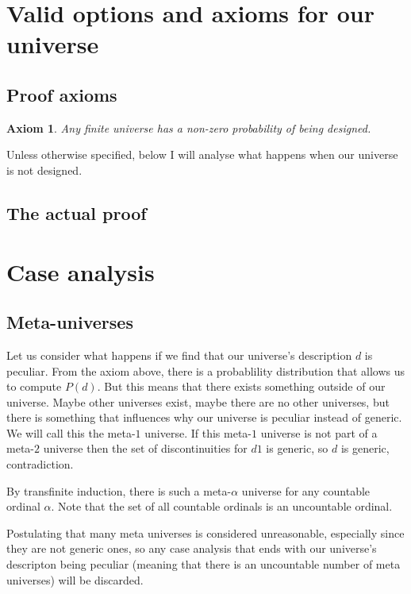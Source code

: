 \documentclass[a4paper
,draft
]{article}
\newtheorem{axiom}{Axiom}
\begin{document}
\section{Valid options and axioms for our universe}


\subsection{Proof axioms}

\begin{axiom}
Any finite universe has a non-zero probability of being designed.
\end{axiom}

Unless otherwise specified, below I will analyse what happens when our
universe is not designed.

\subsection {The actual proof}

\section{Case analysis}

\subsection{Meta-universes}

Let us consider what happens if we find that our universe's description $d$ is peculiar. From the axiom above, there is a probablility distribution that allows us to compute $P(d)$. But this means that there exists something outside of our universe. Maybe other universes exist, maybe there are no other universes, but there is something that influences why our universe is peculiar instead of generic. We will call this the meta-$1$ universe. If this meta-$1$ universe is not part of a meta-$2$ universe then the set of discontinuities for $d1$ is generic, so $d$ is generic, contradiction.

By transfinite induction, there is such a meta-$\alpha$ universe for any countable ordinal $\alpha$. Note that the set of all countable ordinals is an uncountable ordinal.

Postulating that many meta universes is considered unreasonable, especially since they are not generic ones, so any case analysis that ends with our universe's descripton being peculiar (meaning that there is an uncountable number of meta universes) will be discarded.
\end{document}
